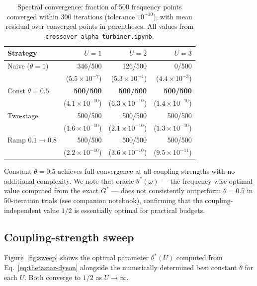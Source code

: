 \documentclass[aps,prb,twocolumn,superscriptaddress,nofootinbib,longbibliography,floatfix]{revtex4-2}
\newcommand{\optparam}{\theta^{*}}
\newcommand{\Gstar}{G^{*}}
\theoremstyle{plain}
\theoremstyle{remark}
\begin{document}
\begin{table}[tp]
  \centering
  \caption{%
    Spectral convergence: fraction of 500 frequency points
    converged within 300 iterations (tolerance $10^{-10}$),
    with mean residual over converged points in parentheses.
    All values from \texttt{crossover\_alpha\_turbiner.ipynb}.
  }
  \label{tab:spectral}
  \begin{tabular}{@{}l r r r@{}}
    \toprule
    Strategy & $U\!=\!1$ & $U\!=\!2$ & $U\!=\!3$ \\
    \midrule
    Naive ($\theta\!=\!1$)
      & 346/500 & 126/500 & 0/500 \\
      & ($5.5{\times}10^{-7}$) & ($5.3{\times}10^{-4}$) & ($4.4{\times}10^{-3}$) \\[3pt]
    Const $\theta\!=\!0.5$
      & \textbf{500/500} & \textbf{500/500} & \textbf{500/500} \\
      & ($4.1{\times}10^{-10}$) & ($6.3{\times}10^{-10}$) & ($1.4{\times}10^{-10}$) \\[3pt]
    Two-stage
      & 500/500 & 500/500 & 500/500 \\
      & ($1.6{\times}10^{-10}$) & ($2.1{\times}10^{-10}$) & ($1.3{\times}10^{-10}$) \\[3pt]
    Ramp $0.1{\to}0.8$
      & 500/500 & 500/500 & 500/500 \\
      & ($2.2{\times}10^{-10}$) & ($3.6{\times}10^{-10}$) & ($9.5{\times}10^{-11}$) \\
    \bottomrule
  \end{tabular}
\end{table}

Constant $\theta = 0.5$ achieves full convergence at all
coupling strengths with no additional complexity.  We note
that oracle $\theta^*(\omega)$ — the frequency-wise optimal
value computed from the exact $\Gstar$ — does not
consistently outperform $\theta = 0.5$ in 50-iteration trials
(see companion notebook), confirming that the
coupling-independent value $1/2$ is essentially optimal for
practical budgets.

\subsection{Coupling-strength sweep}
\label{ssec:sweep}

Figure~\ref{fig:sweep} shows the optimal parameter
$\optparam(U)$ computed from Eq.~\eqref{eq:thetastar-dyson}
alongside the numerically determined best constant $\theta$ for
each $U$.  Both converge to $1/2$ as $U \to \infty$.
\end{document}
